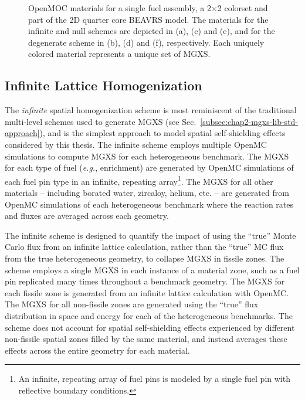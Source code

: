 \begin{figure}[h!]
\begin{subfigure}{.45\textwidth}
  \caption{}
  \label{fig:chap8-full-core-degenerate-materials}
\end{subfigure}
\caption[Depiction of spatial homogenization schemes]{OpenMOC materials for a single fuel assembly, a 2$\times$2 colorset and part of the 2D quarter core \ac{BEAVRS} model. The materials for the infinite and null schemes are depicted in (a), (c) and (e), and for the degenerate scheme in (b), (d) and (f), respectively. Each uniquely colored material represents a unique set of \ac{MGXS}.}
\label{fig:chap8-homogenization-schemes}
\end{figure}

\subsection{Infinite Lattice Homogenization}
\label{subsec:chap8-infinite}

The \textit{infinite} spatial homogenization scheme is most reminiscent of the traditional multi-level schemes used to generate \ac{MGXS} (see Sec.~\ref{subsec:chap2-mgxs-lib-std-approach}), and is the simplest approach to model spatial self-shielding effects considered by this thesis. The infinite scheme employs multiple OpenMC simulations to compute \ac{MGXS} for each heterogeneous benchmark. The \ac{MGXS} for each type of fuel (\textit{e.g.}, enrichment) are generated by OpenMC simulations of each fuel pin type in an infinite, repeating array\footnote{An infinite, repeating array of fuel pins is modeled by a single fuel pin with reflective boundary conditions.}. The \ac{MGXS} for all other materials -- including borated water, zircaloy, helium, etc. -- are generated from OpenMC simulations of each heterogeneous benchmark where the reaction rates and fluxes are averaged across each geometry.

The infinite scheme is designed to quantify the impact of using the ``true'' Monte Carlo flux from an infinite lattice calculation, rather than the ``true'' \ac{MC} flux from the true heterogeneous geometry, to collapse \ac{MGXS} in fissile zones. The scheme employs a single \ac{MGXS} in each instance of a material zone, such as a fuel pin replicated many times throughout a benchmark geometry. The \ac{MGXS} for each fissile zone is generated from an infinite lattice calculation with OpenMC. The \ac{MGXS} for all non-fissile zones are generated using the ``true''  flux distribution in space and energy for each of the heterogeneous benchmarks. The scheme does not account for spatial self-shielding effects experienced by different non-fissile spatial zones filled by the same material, and instead averages these effects across the entire geometry for each material.

